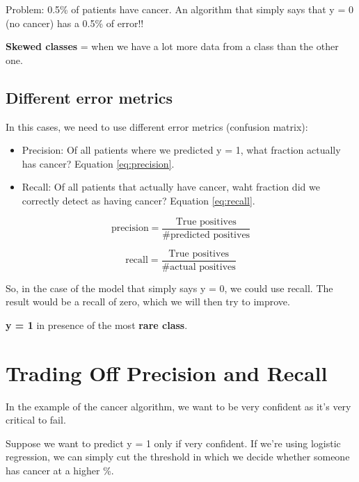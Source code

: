 \documentclass[11pt]{extarticle}
\begin{document}
Problem: 0.5\% of patients have cancer. An algorithm that simply says
that y = 0 (no cancer) has a 0.5\% of error!!

\textbf{Skewed classes} = when we have a lot more data from a class than
the other one.

\subsection{Different error metrics}\label{different-error-metrics}

In this cases, we need to use different error metrics (confusion
matrix):

\begin{itemize}
\itemsep1pt\parskip0pt
\item
  Precision: Of all patients where we predicted y = 1, what fraction
  actually has cancer? Equation \ref{eq:precision}.
\item
  Recall: Of all patients that actually have cancer, waht fraction did
  we correctly detect as having cancer? Equation \ref{eq:recall}.
\end{itemize}

\begin{equation} \label{eq:precision}
\text{precision} = \frac{\text{True positives}}{\text{\# predicted positives}}
\end{equation}

\begin{equation} \label{eq:recall}
\text{recall} = \frac{\text{True positives}}{\text{\# actual positives}}
\end{equation}

So, in the case of the model that simply says y = 0, we could use
recall. The result would be a recall of zero, which we will then try to
improve.

\textbf{y = 1} in presence of the most \textbf{rare class}.

\section{Trading Off Precision and
Recall}\label{trading-off-precision-and-recall}

In the example of the cancer algorithm, we want to be very confident as
it's very critical to fail.

Suppose we want to predict y = 1 only if very confident. If we're using
logistic regression, we can simply cut the threshold in which we decide
whether someone has cancer at a higher \%.
\end{document}
